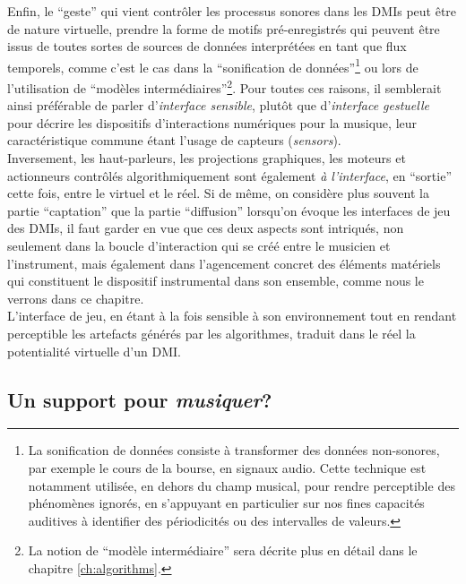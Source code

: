 \indent Enfin, le ``geste'' qui vient contrôler les processus sonores dans les \glspl{DMI} peut être de nature virtuelle, prendre la forme de motifs pré-enregistrés qui peuvent être issus de toutes sortes de sources de données interprétées en tant que flux temporels, comme c'est le cas dans la ``sonification de données''\footnote{La sonification de données consiste à transformer des données non-sonores, par exemple le cours de la bourse, en signaux audio. Cette technique est notamment utilisée, en dehors du champ musical, pour rendre perceptible des phénomènes ignorés, en s'appuyant en particulier sur nos fines capacités auditives à identifier des périodicités ou des intervalles de valeurs.} ou lors de l'utilisation de ``modèles intermédiaires''\footnote{La notion de ``modèle intermédiaire'' sera décrite plus en détail dans le chapitre \ref{ch:algorithms}.}. Pour toutes ces raisons, il semblerait ainsi préférable de parler d'\textit{interface sensible}, plutôt que d'\textit{interface gestuelle} pour décrire les dispositifs d'interactions numériques pour la musique, leur caractéristique commune étant l'usage de capteurs (\textit{sensors}).\\
\indent Inversement, les haut-parleurs, les projections graphiques, les moteurs et actionneurs contrôlés algorithmiquement sont également \textit{à l'interface}, en ``sortie'' cette fois, entre le virtuel et le réel. Si de même, on considère plus souvent la partie ``captation'' que la partie ``diffusion'' lorsqu'on évoque les interfaces de jeu des \glspl{DMI}, il faut garder en vue que ces deux aspects sont intriqués, non seulement dans la boucle d'interaction qui se créé entre le musicien et l'instrument, mais également dans l'agencement concret des éléments matériels qui constituent le dispositif instrumental dans son ensemble, comme nous le verrons dans ce chapitre.\\
\indent L'interface de jeu, en étant à la fois sensible à son environnement tout en rendant perceptible les artefacts générés par les algorithmes, traduit dans le réel la potentialité virtuelle d'un \gls{DMI}.


\subsection{Un support pour \textit{musiquer}?}

